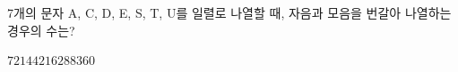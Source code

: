 7개의 문자 A, C, D, E, S, T, U를 일렬로 나열할 때, 자음과 모음을 번갈아 나열하는 경우의 수는?
\begin{choices32}{$72$}{$144$}{$216$}{$288$}{$360$}\end{choices32}
